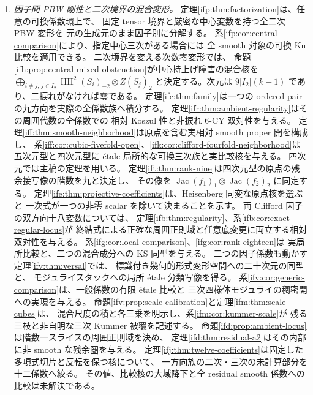 \begin{enumerate}
 \item \emph{因子間 PBW 剛性と二次境界の混合変形。}
 定理\ref{ifp:thm:factorization}は、任意の可換係数環上で、
 固定 tensor 境界と厳密な中心変数を持つ全二次 PBW 変形を
 元の生成元のまま因子別に分解する。
 系\ref{ifp:cor:central-comparison}により、指定中心三次がある場合には
 全 smooth 対象の可換 Ku 比較を適用できる。
 二次境界を変える次数零変形では、
 命題\ref{ifh:prop:central-mixed-obstruction}が中心持上げ障害の混合核を
 $\bigoplus_{i\ne j,\,j\in I_2}\operatorname{HH}^2(S_i)_{-2}\otimes Z(S_j)_2$
 と決定する。次元は $9|I_2|(k-1)$ であり、二捩れがなければ零である。
 定理\ref{ifc:thm:family}は一つの ordered pair の九方向を実際の全係数族へ積分する。
 定理\ref{ifr:thm:ambient-regularity}はその周囲代数の全係数での
 相対 Koszul 性と非捩れ $6$-CY 双対性を与える。
 定理\ref{iff:thm:smooth-neighborhood}は原点を含む実相対 smooth proper 開を構成し、
 系\ref{iff:cor:cubic-fivefold-open}、\ref{ifk:cor:clifford-fourfold-neighborhood}は
 五次元型と四次元型に \'etale 局所的な可換三次族と実比較核を与える。
 四次元では主稿の定理を用いる。
 定理\ref{ift:thm:rank-nine}は四次元型の原点の残余接写像の階数を九と決定し、
 その像を $\operatorname{Jac}(f_1)_1\otimes\operatorname{Jac}(f_2)_2$ に同定する。
 定理\ref{ife:thm:projective-coefficients}は、Heisenberg 同変な原点核を選ぶと
 一次式が一つの非零 scalar を除いて決まることを示す。
 両 Clifford 因子の双方向十八変数については、
 定理\ref{ifb:thm:regularity}、系\ref{ifb:cor:exact-regular-locus}が
 終結式による正確な周囲正則域と任意底変更に両立する相対双対性を与える。
 系\ref{ifg:cor:local-comparison}、\ref{ifg:cor:rank-eighteen}は
 実局所比較と、二つの混合成分への KS 同型を与える。
 二つの因子係数も動かす定理\ref{ifv:thm:versal}では、
 標識付き幾何的形式変形空間への二十次元の同型と、
 モジュライスタックへの局所 \'etale 分類写像を得る。
 系\ref{ifv:cor:generic-comparison}は、一般係数の有限 \'etale 比較と
 三次四様体モジュライの稠密開への実現を与える。
 命題\ref{ifv:prop:scale-calibration}と定理\ref{ifm:thm:scale-cubes}は、
 混合尺度の積と各三乗を明示し、系\ref{ifm:cor:kummer-scale}が
 残る三枝と非自明な三次 Kummer 被覆を記述する。
 命題\ref{ifd:prop:ambient-locus}は階数一スライスの周囲正則域を決め、
 定理\ref{ifd:thm:residual-a2}はその内部に非 smooth な残余圏を与える。
 定理\ref{ifj:thm:twelve-coefficients}は固定した多項式切片と反転を保つ核について、
 一方向族の二次・三次の未計算部分を十二係数へ絞る。
 その値、比較核の大域降下と全 residual smooth 係数への比較は未解決である。


\end{enumerate}
